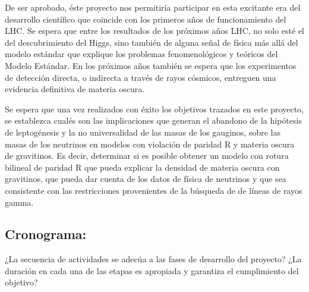 De ser aprobado, éste proyecto nos permitiría participar en esta
excitante era del desarrollo científico que coincide con
los primeros años de funcionamiento del LHC.  Se espera que entre los
resultados de los próximos años LHC, no solo esté el del
descubrimiento del Higgs, sino también de alguna señal de física más
allá del modelo estándar que explique los problemas fenomenológicos y
teóricos del Modelo Estándar. En los próximos años también se espera
que los experimentos de detección directa, o indirecta a través de
rayos cósmicos, entreguen una evidencia definitiva de materia oscura.

Se espera que una vez realizados con éxito los objetivos trazados en este proyecto, se establezca cualés son las implicaciones que generan el abandono de la hipótesis de leptogénesis y la no universalidad de las masas de los gauginos, sobre las masas de los neutrinos en modelos con violación de paridad R y materia oscura de gravitinos. Es decir, determinar si es posible obtener un modelo con rotura bilineal de paridad R que pueda explicar la densidad de materia oscura con gravitinos, que pueda dar cuenta de los datos de física de neutrinos y que sea consistente con las restricciones provenientes de la búsqueda de de líneas de rayos gamma. 


\subsection{Cronograma:                                    }
\begin{instrucciones}
  ¿La secuencia de actividades se adecúa a las fases de desarrollo del proyecto? ¿La duración en cada una de las etapas es apropiada y garantiza el cumplimiento del objetivo?
\end{instrucciones}


